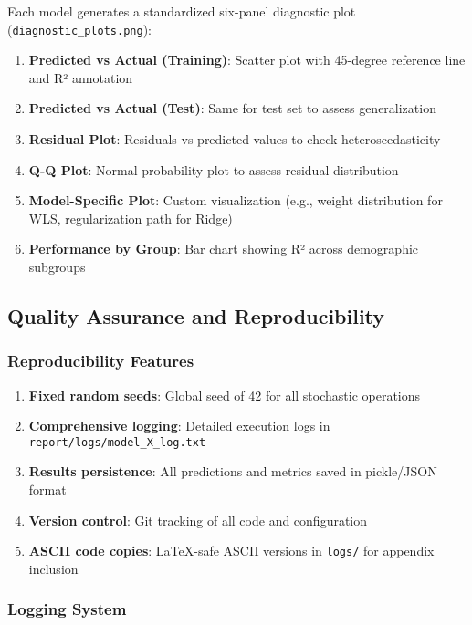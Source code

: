 Each model generates a standardized six-panel diagnostic plot (\texttt{diagnostic\_plots.png}):

\begin{enumerate}
    \item \textbf{Predicted vs Actual (Training)}: Scatter plot with 45-degree reference line and R² annotation
    \item \textbf{Predicted vs Actual (Test)}: Same for test set to assess generalization
    \item \textbf{Residual Plot}: Residuals vs predicted values to check heteroscedasticity
    \item \textbf{Q-Q Plot}: Normal probability plot to assess residual distribution
    \item \textbf{Model-Specific Plot}: Custom visualization (e.g., weight distribution for WLS, regularization path for Ridge)
    \item \textbf{Performance by Group}: Bar chart showing R² across demographic subgroups
\end{enumerate}

\subsection{Quality Assurance and Reproducibility}

\subsubsection{Reproducibility Features}

\begin{enumerate}
    \item \textbf{Fixed random seeds}: Global seed of 42 for all stochastic operations
    \item \textbf{Comprehensive logging}: Detailed execution logs in \texttt{report/logs/model\_X\_log.txt}
    \item \textbf{Results persistence}: All predictions and metrics saved in pickle/JSON format
    \item \textbf{Version control}: Git tracking of all code and configuration
    \item \textbf{ASCII code copies}: LaTeX-safe ASCII versions in \texttt{logs/} for appendix inclusion
\end{enumerate}

\subsubsection{Logging System}


